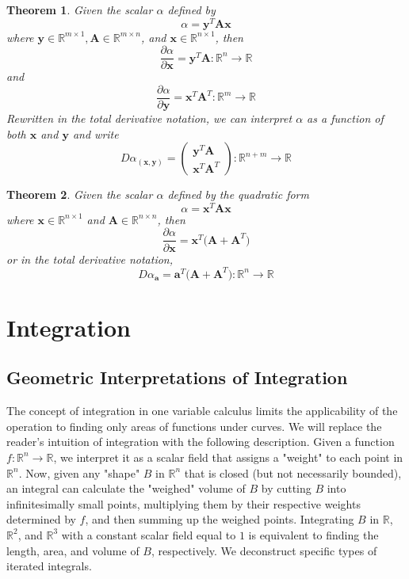 \documentclass{article}
\newtheorem{theorem}{Theorem}[section]
\theoremstyle{remark}
\theoremstyle{definition}
\begin{document}
\begin{theorem}
Given the scalar $\alpha$ defined by 
\[\alpha = \mathbf{y}^T \mathbf{A} \mathbf{x}\]
where $\mathbf{y} \in \mathbb{R}^{m \times 1}, \mathbf{A} \in \mathbb{R}^{m \times n}$, and $\mathbf{x} \in \mathbb{R}^{n \times 1}$, then 
\[\frac{\partial \alpha}{\partial \mathbf{x}} = \mathbf{y}^T \mathbf{A} : \mathbb{R}^n \longrightarrow \mathbb{R}\]
and 
\[\frac{\partial \alpha}{\partial \mathbf{y}} = \mathbf{x}^T \mathbf{A}^T : \mathbb{R}^m \longrightarrow \mathbb{R}\]
Rewritten in the total derivative notation, we can interpret $\alpha$ as a function of both $\mathbf{x}$ and $\mathbf{y}$ and write 
\[D \alpha_{(\mathbf{x}, \mathbf{y})} = \begin{pmatrix} \mathbf{y}^T \mathbf{A} \\ \mathbf{x}^T \mathbf{A}^T \end{pmatrix} : \mathbb{R}^{n + m} \longrightarrow \mathbb{R}\]
\end{theorem}

\begin{theorem}
Given the scalar $\alpha$ defined by the quadratic form 
\[\alpha = \mathbf{x}^T \mathbf{A} \mathbf{x}\]
where $\mathbf{x} \in \mathbb{R}^{n \times 1}$ and $\mathbf{A} \in \mathbb{R}^{n \times n}$, then 
\[\frac{\partial \alpha}{\partial \mathbf{x}} = \mathbf{x}^T \big( \mathbf{A} + \mathbf{A}^T \big)\]
or in the total derivative notation, 
\[D \alpha_\mathbf{a} = \mathbf{a}^T \big( \mathbf{A} + \mathbf{A}^T \big) : \mathbb{R}^n \longrightarrow \mathbb{R}\]
\end{theorem}

\section{Integration}

\subsection{Geometric Interpretations of Integration}
The concept of integration in one variable calculus limits the applicability of the operation to finding only areas of functions under curves. We will replace the reader's intuition of integration with the following description. Given a function $f: \mathbb{R}^n \longrightarrow \mathbb{R}$, we interpret it as a scalar field that assigns a "weight" to each point in $\mathbb{R}^n$. Now, given any "shape" $B$ in $\mathbb{R}^n$ that is closed (but not necessarily bounded), an integral can calculate the "weighed" volume of $B$ by cutting $B$ into infinitesimally small points, multiplying them by their respective weights determined by $f$, and then summing up the weighed points. Integrating $B$ in $\mathbb{R}$, $\mathbb{R}^2$, and $\mathbb{R}^3$ with a constant scalar field equal to $1$ is equivalent to finding the length, area, and volume of $B$, respectively. We deconstruct specific types of iterated integrals. 
\end{document}
